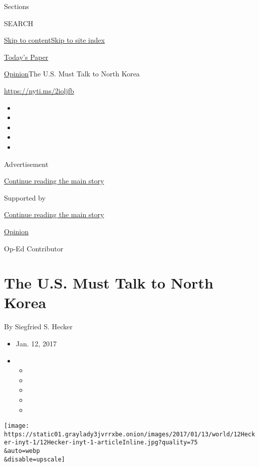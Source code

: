 Sections

SEARCH

\protect\hyperlink{site-content}{Skip to
content}\protect\hyperlink{site-index}{Skip to site index}

\href{https://myaccount.nytimes3xbfgragh.onion/auth/login?response_type=cookie\&client_id=vi}{}

\href{https://www.nytimes3xbfgragh.onion/section/todayspaper}{Today's
Paper}

\href{/section/opinion}{Opinion}\textbar{}The U.S. Must Talk to North
Korea

\url{https://nyti.ms/2ioljfb}

\begin{itemize}
\item
\item
\item
\item
\item
\end{itemize}

Advertisement

\protect\hyperlink{after-top}{Continue reading the main story}

Supported by

\protect\hyperlink{after-sponsor}{Continue reading the main story}

\href{/section/opinion}{Opinion}

Op-Ed Contributor

\hypertarget{the-us-must-talk-to-north-korea}{%
\section{The U.S. Must Talk to North
Korea}\label{the-us-must-talk-to-north-korea}}

By Siegfried S. Hecker

\begin{itemize}
\item
  Jan. 12, 2017
\item
  \begin{itemize}
  \item
  \item
  \item
  \item
  \item
  \end{itemize}
\end{itemize}

\texttt{[image: https://static01.graylady3jvrrxbe.onion/images/2017/01/13/world/12Hecker-inyt-1/12Hecker-inyt-1-articleInline.jpg?quality=75\\\&auto=webp\\\&disable=upscale]}

